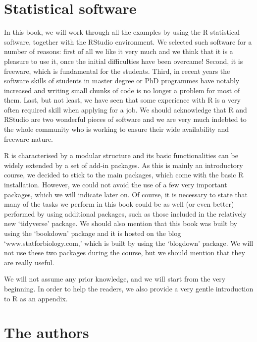 \documentclass[a4paper,12pt,oneside]{book}
\begin{document}
\hypertarget{statistical-software}{%
\section*{Statistical software}\label{statistical-software}}

In this book, we will work through all the examples by using the R statistical software, together with the RStudio environment. We selected such software for a number of reasons: first of all we like it very much and we think that it is a pleasure to use it, once the initial difficulties have been overcame! Second, it is freeware, which is fundamental for the students. Third, in recent years the software skills of students in master degree or PhD programmes have notably increased and writing small chunks of code is no longer a problem for most of them. Last, but not least, we have seen that some experience with R is a very often required skill when applying for a job. We should acknowledge that R and RStudio are two wonderful pieces of software and we are very much indebted to the whole community who is working to ensure their wide availability and freeware nature.

R is characterised by a modular structure and its basic functionalities can be widely extended by a set of add-in packages. As this is mainly an introductory course, we decided to stick to the main packages, which come with the basic R installation. However, we could not avoid the use of a few very important packages, which we will indicate later on. Of course, it is necessary to state that many of the tasks we perform in this book could be as well (or even better) performed by using additional packages, such as those included in the relatively new `tidyverse' package. We should also mention that this book was built by using the `bookdown' package and it is hosted on the blog `www.statforbiology.com,' which is built by using the `blogdown' package. We will not use these two packages during the course, but we should mention that they are really useful.

We will not assume any prior knowledge, and we will start from the very beginning. In order to help the readers, we also provide a very gentle introduction to R as an appendix.

\hypertarget{the-authors}{%
\section*{The authors}\label{the-authors}}
\end{document}

